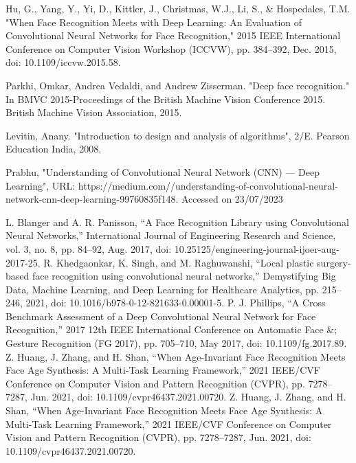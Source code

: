 \documentclass[12pt,a4paper]{report}
\begin{document}
\newpage
\pagestyle{plain}
\renewcommand{\bibname}{References}

\begin{thebibliography}{35}
Hu, G., Yang, Y., Yi, D., Kittler, J., Christmas, W.J., Li, S., \& Hospedales, T.M. "When Face Recognition Meets with Deep Learning: An Evaluation of Convolutional Neural Networks for Face Recognition," 2015 IEEE International Conference on Computer Vision Workshop (ICCVW), pp. 384–392, Dec. 2015, doi: 10.1109/iccvw.2015.58.

Parkhi, Omkar, Andrea Vedaldi, and Andrew Zisserman. "Deep face recognition." In BMVC 2015-Proceedings of the British Machine Vision Conference 2015. British Machine Vision Association, 2015.

Levitin, Anany. "Introduction to design and analysis of algorithms", 2/E. Pearson Education India, 2008.

Prabhu, "Understanding of Convolutional Neural Network (CNN) — Deep Learning", URL: https://medium.com/\@RaghavPrabhu/understanding-of-convolutional-neural-network-cnn-deep-learning-99760835f148. Accessed on 23/07/2023

L. Blanger and A. R. Panisson, “A Face Recognition Library using Convolutional Neural Networks,” International Journal of Engineering Research and Science, vol. 3, no. 8, pp. 84–92, Aug. 2017, doi: 10.25125/engineering-journal-ijoer-aug-2017-25.
R. Khedgaonkar, K. Singh, and M. Raghuwanshi, “Local plastic surgery-based face recognition using convolutional neural networks,” Demystifying Big Data, Machine Learning, and Deep Learning for Healthcare Analytics, pp. 215–246, 2021, doi: 10.1016/b978-0-12-821633-0.00001-5.
P. J. Phillips, “A Cross Benchmark Assessment of a Deep Convolutional Neural Network for Face Recognition,” 2017 12th IEEE International Conference on Automatic Face \&; Gesture Recognition (FG 2017), pp. 705–710, May 2017, doi: 10.1109/fg.2017.89.
Z. Huang, J. Zhang, and H. Shan, “When Age-Invariant Face Recognition Meets Face Age Synthesis: A Multi-Task Learning Framework,” 2021 IEEE/CVF Conference on Computer Vision and Pattern Recognition (CVPR), pp. 7278–7287, Jun. 2021, doi: 10.1109/cvpr46437.2021.00720.
Z. Huang, J. Zhang, and H. Shan, “When Age-Invariant Face Recognition Meets Face Age Synthesis: A Multi-Task Learning Framework,” 2021 IEEE/CVF Conference on Computer Vision and Pattern Recognition (CVPR), pp. 7278–7287, Jun. 2021, doi: 10.1109/cvpr46437.2021.00720.
\end{thebibliography}
\end{document}
